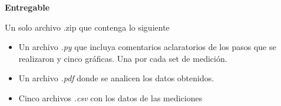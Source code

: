 \documentclass[12pt]{article}
\begin{document}
\noindent\textbf{Entregable}

Un solo archivo .zip que contenga lo siguiente
\begin{itemize}
    \item Un archivo \emph{.py} que incluya comentarios aclaratorios de los pasos que se realizaron y cinco gráficas. Una por cada set de medición.
    \item Un archivo \emph{.pdf} donde se analicen los datos obtenidos.
    \item Cinco archivos \emph{.csv} con los datos de las mediciones
\end{itemize}
\end{document}
